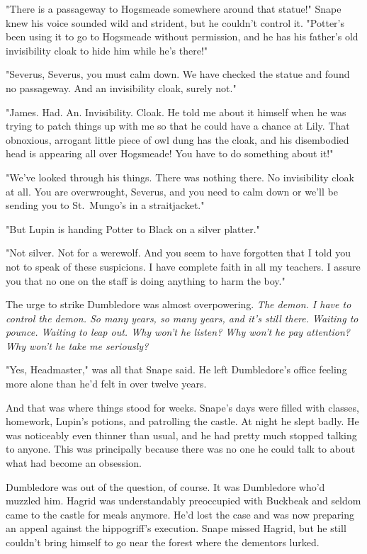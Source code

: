 "There is a passageway to Hogsmeade somewhere around that statue!" Snape knew his voice sounded wild and strident, but he couldn't control it. "Potter's been using it to go to Hogsmeade without permission, and he has his father's old invisibility cloak to hide him while he's there!"

"Severus, Severus, you must calm down. We have checked the statue and found no passageway. And an invisibility cloak, surely not."

"James. Had. An. Invisibility. Cloak. He told me about it himself when he was trying to patch things up with me so that he could have a chance at Lily. That obnoxious, arrogant little piece of owl dung has the cloak, and his disembodied head is appearing all over Hogsmeade! You have to do something about it!"

"We've looked through his things. There was nothing there. No invisibility cloak at all. You are overwrought, Severus, and you need to calm down or we'll be sending you to St.~Mungo's in a straitjacket."

"But Lupin is handing Potter to Black on a silver platter."

"Not silver. Not for a werewolf. And you seem to have forgotten that I told you not to speak of these suspicions. I have complete faith in all my teachers. I assure you that no one on the staff is doing anything to harm the boy."

The urge to strike Dumbledore was almost overpowering. \emph{The demon. I have to control the demon. So many years, so many years, and it's still there. Waiting to pounce. Waiting to leap out. Why won't he listen? Why won't he pay attention? Why won't he take me seriously?}

"Yes, Headmaster," was all that Snape said. He left Dumbledore's office feeling more alone than he'd felt in over twelve years.

And that was where things stood for weeks. Snape's days were filled with classes, homework, Lupin's potions, and patrolling the castle. At night he slept badly. He was noticeably even thinner than usual, and he had pretty much stopped talking to anyone. This was principally because there was no one he could talk to about what had become an obsession.

Dumbledore was out of the question, of course. It was Dumbledore who'd muzzled him. Hagrid was understandably preoccupied with Buckbeak and seldom came to the castle for meals anymore. He'd lost the case and was now preparing an appeal against the hippogriff's execution. Snape missed Hagrid, but he still couldn't bring himself to go near the forest where the dementors lurked.

